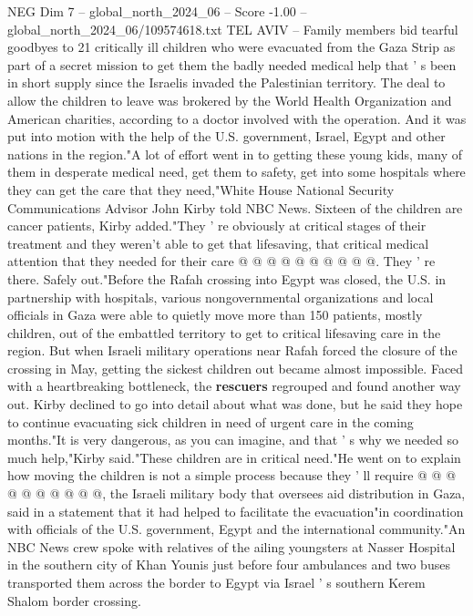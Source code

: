 \begin{textsample}{NEG Dim 7 – global\_north\_2024\_06 – Score -1.00 – global\_north\_2024\_06/109574618.txt}  \label{ex:f7_neg_371}
TEL AVIV -- Family members bid tearful goodbyes to 21 critically ill children who were evacuated from the Gaza Strip as part of a secret mission to get them the badly needed medical help that ' s been in short supply since the Israelis invaded the Palestinian territory.
The deal to allow the children to leave was brokered by the World Health Organization and American charities, according to a doctor involved with the operation.
And it was put into motion with the help of the U.S. government, Israel, Egypt and other nations in the region."A lot of effort went in to getting these young kids, many of them in desperate medical need, get them to safety, get into some hospitals where they can get the care that they need,"White House National Security Communications Advisor John Kirby told NBC News.
Sixteen of the children are cancer patients, Kirby added."They ' re obviously at critical stages of their treatment and they weren't able to get that lifesaving, that critical medical attention that they needed for their care @ @ @ @ @ @ @ @ @ @.
They ' re there.
Safely out."Before the Rafah crossing into Egypt was closed, the U.S. in partnership with hospitals, various nongovernmental organizations and local officials in Gaza were able to quietly move more than 150 patients, mostly children, out of the embattled territory to get to critical lifesaving care in the region.
But when Israeli military operations near Rafah forced the closure of the crossing in May, getting the sickest children out became almost impossible.
Faced with a heartbreaking bottleneck, the \textbf{rescuers} regrouped and found another way out.
Kirby declined to go into detail about what was done, but he said they hope to continue evacuating sick children in need of urgent care in the coming months."It is very dangerous, as you can imagine, and that ' s why we needed so much help,"Kirby said."These children are in critical need."He went on to explain how moving the children is not a simple process because they ' ll require @ @ @ @ @ @ @ @ @ @, the Israeli military body that oversees aid distribution in Gaza, said in a statement that it had helped to facilitate the evacuation"in coordination with officials of the U.S. government, Egypt and the international community."An NBC News crew spoke with relatives of the ailing youngsters at Nasser Hospital in the southern city of Khan Younis just before four ambulances and two buses transported them across the border to Egypt via Israel ' s southern Kerem Shalom border crossing.

\end{textsample}

